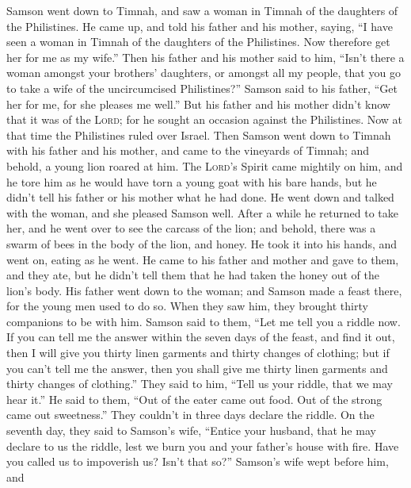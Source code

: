  Samson went down to Timnah, and saw a woman in Timnah of
the daughters of the Philistines.  He came up, and told
his father and his mother, saying, ``I have seen a woman in Timnah of
the daughters of the Philistines. Now therefore get her for me as my
wife.''  Then his father and his mother said to him,
``Isn't there a woman amongst your brothers' daughters, or amongst all
my people, that you go to take a wife of the uncircumcised
Philistines?'' Samson said to his father, ``Get her for me, for she
pleases me well.''  But his father and his mother didn't
know that it was of the \textsc{Lord}; for he sought an occasion against
the Philistines. Now at that time the Philistines ruled over Israel.
 Then Samson went down to Timnah with his father and his
mother, and came to the vineyards of Timnah; and behold, a young lion
roared at him.  The \textsc{Lord}'s Spirit came mightily
on him, and he tore him as he would have torn a young goat with his bare
hands, but he didn't tell his father or his mother what he had done.
 He went down and talked with the woman, and she pleased
Samson well.  After a while he returned to take her, and
he went over to see the carcass of the lion; and behold, there was a
swarm of bees in the body of the lion, and honey.  He took
it into his hands, and went on, eating as he went. He came to his father
and mother and gave to them, and they ate, but he didn't tell them that
he had taken the honey out of the lion's body.  His
father went down to the woman; and Samson made a feast there, for the
young men used to do so.  When they saw him, they brought
thirty companions to be with him.  Samson said to them,
``Let me tell you a riddle now. If you can tell me the answer within the
seven days of the feast, and find it out, then I will give you thirty
linen garments and thirty changes of clothing;  but if
you can't tell me the answer, then you shall give me thirty linen
garments and thirty changes of clothing.'' They said to him, ``Tell us
your riddle, that we may hear it.''  He said to them,
``Out of the eater came out food. Out of the strong came out
sweetness.'' They couldn't in three days declare the riddle.
 On the seventh day, they said to Samson's wife, ``Entice
your husband, that he may declare to us the riddle, lest we burn you and
your father's house with fire. Have you called us to impoverish us?
Isn't that so?''  Samson's wife wept before him, and

